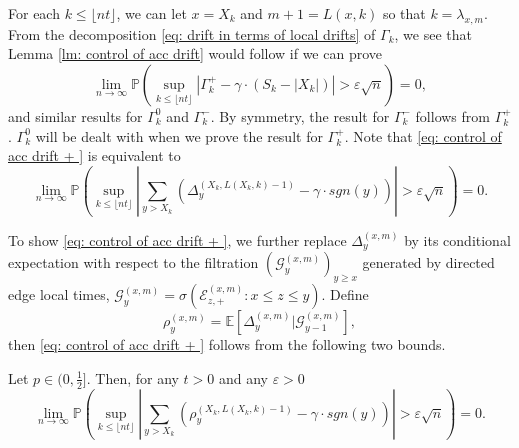 \documentclass[EJP]{ejpecp} %
\newcommand{\abs}[1]{\left\vert #1 \right\vert}
\begin{document}
For each $k\leq \lfloor nt\rfloor$, we can let $x = X_k$ and $ m +1=L(x,k)$ so that $k = \lambda_{x,m}$. From the decomposition \eqref{eq: drift in terms of local drifts} of $\Gamma_k$, we see that
Lemma \ref{lm: control of acc drift} would follow if we can prove
\begin{equation}\label{eq: control of acc drift + }
	\lim_{n \to \infty }\mathbb{P}\left(\sup_{k\leq\lfloor nt \rfloor} \abs{\Gamma^+_k - \gamma \cdot \left(S_k - \abs{X_k} \right)   } > \varepsilon \sqrt{n}  \right) =0, 
\end{equation}
and similar results for $\Gamma_k^0$ and $\Gamma_k^-$. By symmetry, the result for $\Gamma_k^-$ follows from $\Gamma_k^+$. 
$\Gamma_k^0$ will be dealt with when we prove the result for $\Gamma_k^+$.
Note that \eqref{eq: control of acc drift + } is equivalent to
\begin{equation}
	\lim_{n \to \infty }\mathbb{P}\left(\sup_{k\leq\lfloor nt \rfloor} \abs{\sum_{y> X_k} \left( \Delta_{y}^{(X_k,L(X_k,k) - 1)} - \gamma  \cdot sgn(y) \right)   }  > \varepsilon \sqrt{n}  \right) =0. 
\end{equation}

To show \eqref{eq: control of acc drift + }, we further replace $\Delta_{y}^{(x,m)}$ by its conditional expectation with respect to the filtration $\left(\mathcal{G}_{y}^{(x,m)}\right)_{y\geq x}$ generated by directed edge local times, $ \mathcal{G}_{y}^{(x,m)} = \sigma\left( \mathcal{E}^{(x,m)}_{z,+} : x \le z \leq y \right)$.
Define
\begin{equation}\label{eq: conditional mean}
	\rho_{y}^{(x,m)}= \mathbb{E}\left[\Delta_y^{(x,m)} | \mathcal{G}_{y-1}^{(x,m)}\right],
\end{equation}
then \eqref{eq: control of acc drift + } follows from the following two bounds.
\begin{lemma}\label{lm: approximation of means of local drift}
	Let $p\in (0,\frac{1}{2}]$. Then, for any $t>0$ and any $\varepsilon >0$
	\begin{equation}\label{eq: control of expected local drift}
		\lim_{n \to \infty }\mathbb{P}\left(\sup_{k\leq\lfloor nt \rfloor} \abs{\sum_{y> X_k} \left( \rho_{y}^{(X_k,L(X_k,k)-1)} - \gamma  \cdot sgn(y) \right)   }  > \varepsilon \sqrt{n}  \right) =0. 
	\end{equation}
\end{lemma}
\end{document}
